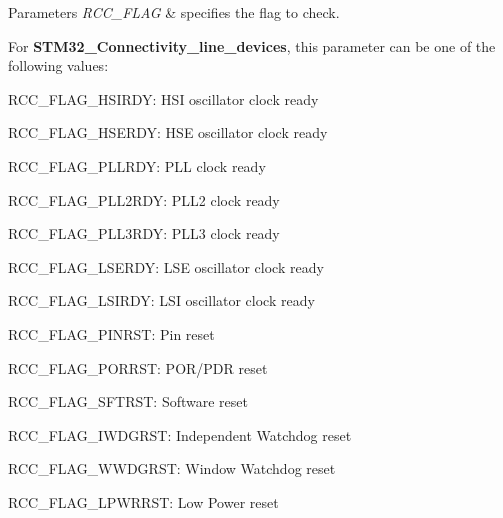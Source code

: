 \begin{DoxyParams}{Parameters}
{\em R\+C\+C\+\_\+\+F\+L\+AG} & specifies the flag to check.\\
\hline
\end{DoxyParams}
For {\bfseries S\+T\+M32\+\_\+\+Connectivity\+\_\+line\+\_\+devices}, this parameter can be one of the following values\+: \begin{DoxyItemize}
\item R\+C\+C\+\_\+\+F\+L\+A\+G\+\_\+\+H\+S\+I\+R\+DY\+: H\+SI oscillator clock ready \item R\+C\+C\+\_\+\+F\+L\+A\+G\+\_\+\+H\+S\+E\+R\+DY\+: H\+SE oscillator clock ready \item R\+C\+C\+\_\+\+F\+L\+A\+G\+\_\+\+P\+L\+L\+R\+DY\+: P\+LL clock ready \item R\+C\+C\+\_\+\+F\+L\+A\+G\+\_\+\+P\+L\+L2\+R\+DY\+: P\+L\+L2 clock ready \item R\+C\+C\+\_\+\+F\+L\+A\+G\+\_\+\+P\+L\+L3\+R\+DY\+: P\+L\+L3 clock ready \item R\+C\+C\+\_\+\+F\+L\+A\+G\+\_\+\+L\+S\+E\+R\+DY\+: L\+SE oscillator clock ready \item R\+C\+C\+\_\+\+F\+L\+A\+G\+\_\+\+L\+S\+I\+R\+DY\+: L\+SI oscillator clock ready \item R\+C\+C\+\_\+\+F\+L\+A\+G\+\_\+\+P\+I\+N\+R\+ST\+: Pin reset \item R\+C\+C\+\_\+\+F\+L\+A\+G\+\_\+\+P\+O\+R\+R\+ST\+: P\+O\+R/\+P\+DR reset \item R\+C\+C\+\_\+\+F\+L\+A\+G\+\_\+\+S\+F\+T\+R\+ST\+: Software reset \item R\+C\+C\+\_\+\+F\+L\+A\+G\+\_\+\+I\+W\+D\+G\+R\+ST\+: Independent Watchdog reset \item R\+C\+C\+\_\+\+F\+L\+A\+G\+\_\+\+W\+W\+D\+G\+R\+ST\+: Window Watchdog reset \item R\+C\+C\+\_\+\+F\+L\+A\+G\+\_\+\+L\+P\+W\+R\+R\+ST\+: Low Power reset\end{DoxyItemize}
